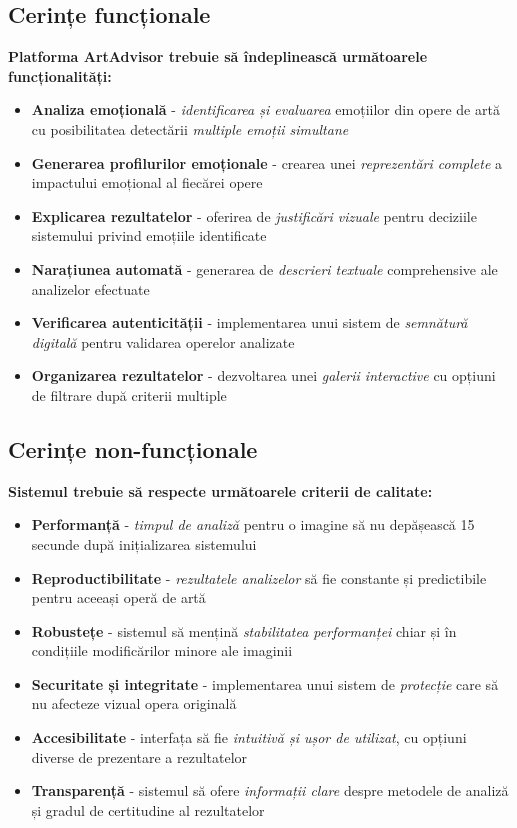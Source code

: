 \subsection{Cerințe funcționale}
\label{subsec:obj-functionale}

\textbf{Platforma ArtAdvisor trebuie să îndeplinească următoarele funcționalități:}

\begin{itemize}
  \item \textbf{Analiza emoțională} - \emph{identificarea și evaluarea} emoțiilor din opere de artă cu posibilitatea detectării \textit{multiple emoții simultane}
  \item \textbf{Generarea profilurilor emoționale} - crearea unei \emph{reprezentări complete} a impactului emoțional al fiecărei opere
  \item \textbf{Explicarea rezultatelor} - oferirea de \textit{justificări vizuale} pentru deciziile sistemului privind emoțiile identificate  
  \item \textbf{Narațiunea automată} - generarea de \emph{descrieri textuale} comprehensive ale analizelor efectuate
  \item \textbf{Verificarea autenticității} - implementarea unui sistem de \textit{semnătură digitală} pentru validarea operelor analizate
  \item \textbf{Organizarea rezultatelor} - dezvoltarea unei \emph{galerii interactive} cu opțiuni de filtrare după criterii multiple
\end{itemize}

\subsection{Cerințe non-funcționale}
\label{subsec:obj-nonfunctionale}

\textbf{Sistemul trebuie să respecte următoarele criterii de calitate:}

\begin{itemize}
  \item \textbf{Performanță} - \emph{timpul de analiză} pentru o imagine să nu depășească 15 secunde după inițializarea sistemului
  \item \textbf{Reproductibilitate} - \textit{rezultatele analizelor} să fie constante și predictibile pentru aceeași operă de artă
  \item \textbf{Robustețe} - sistemul să mențină \emph{stabilitatea performanței} chiar și în condițiile modificărilor minore ale imaginii
  \item \textbf{Securitate și integritate} - implementarea unui sistem de \textit{protecție} care să nu afecteze vizual opera originală
  \item \textbf{Accesibilitate} - interfața să fie \emph{intuitivă și ușor de utilizat}, cu opțiuni diverse de prezentare a rezultatelor
  \item \textbf{Transparență} - sistemul să ofere \textit{informații clare} despre metodele de analiză și gradul de certitudine al rezultatelor
\end{itemize}

